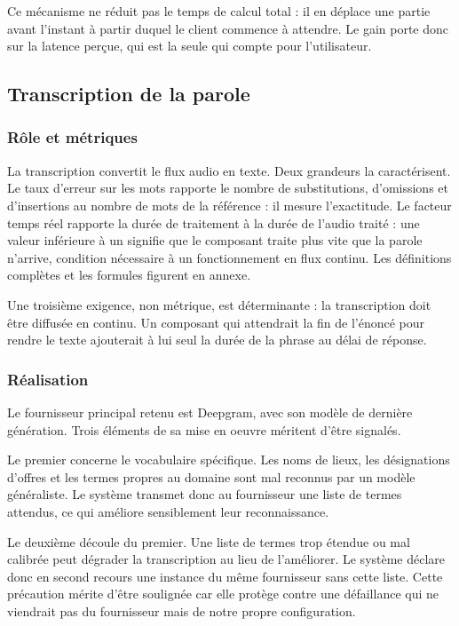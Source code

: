 Ce mécanisme ne réduit pas le temps de calcul total : il en déplace une partie avant l'instant à partir duquel le client commence à attendre. Le gain porte donc sur la latence perçue, qui est la seule qui compte pour l'utilisateur.

\subsection{Transcription de la parole}

\subsubsection{Rôle et métriques}

La transcription convertit le flux audio en texte. Deux grandeurs la caractérisent. Le taux d'erreur sur les mots rapporte le nombre de substitutions, d'omissions et d'insertions au nombre de mots de la référence : il mesure l'exactitude. Le facteur temps réel rapporte la durée de traitement à la durée de l'audio traité : une valeur inférieure à un signifie que le composant traite plus vite que la parole n'arrive, condition nécessaire à un fonctionnement en flux continu. Les définitions complètes et les formules figurent en annexe.

Une troisième exigence, non métrique, est déterminante : la transcription doit être diffusée en continu. Un composant qui attendrait la fin de l'énoncé pour rendre le texte ajouterait à lui seul la durée de la phrase au délai de réponse.

\subsubsection{Réalisation}

Le fournisseur principal retenu est Deepgram, avec son modèle de dernière génération. Trois éléments de sa mise en oeuvre méritent d'être signalés.

Le premier concerne le vocabulaire spécifique. Les noms de lieux, les désignations d'offres et les termes propres au domaine sont mal reconnus par un modèle généraliste. Le système transmet donc au fournisseur une liste de termes attendus, ce qui améliore sensiblement leur reconnaissance.

Le deuxième découle du premier. Une liste de termes trop étendue ou mal calibrée peut dégrader la transcription au lieu de l'améliorer. Le système déclare donc en second recours une instance du même fournisseur sans cette liste. Cette précaution mérite d'être soulignée car elle protège contre une défaillance qui ne viendrait pas du fournisseur mais de notre propre configuration.

